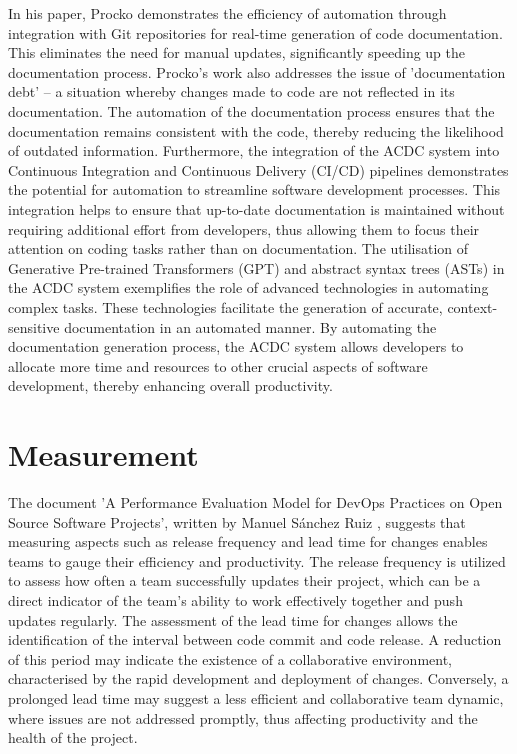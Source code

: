 In his paper, Procko \cite{Procko2024CodeDocumentation} demonstrates the efficiency of automation through integration with Git repositories for real-time generation of code documentation. This eliminates the need for manual updates, significantly speeding up the documentation process. Procko's work also addresses the issue of 'documentation debt' – a situation whereby changes made to code are not reflected in its documentation. The automation of the documentation process ensures that the documentation remains consistent with the code, thereby reducing the likelihood of outdated information. Furthermore, the integration of the ACDC system into Continuous Integration and Continuous Delivery (CI/CD) pipelines demonstrates the potential for automation to streamline software development processes. This integration helps to ensure that up-to-date documentation is maintained without requiring additional effort from developers, thus allowing them to focus their attention on coding tasks rather than on documentation. The utilisation of Generative Pre-trained Transformers (GPT) and abstract syntax trees (ASTs) in the ACDC system exemplifies the role of advanced technologies in automating complex tasks. These technologies facilitate the generation of accurate, context-sensitive documentation in an automated manner. By automating the documentation generation process, the ACDC system allows developers to allocate more time and resources to other crucial aspects of software development, thereby enhancing overall productivity.
 

\section{Measurement}

The document 'A Performance Evaluation Model for DevOps Practices on Open Source Software Projects', written by Manuel Sánchez Ruiz \cite{Ruiz2023}, suggests that measuring aspects such as release frequency and lead time for changes enables teams to gauge their efficiency and productivity. The release frequency is utilized to assess how often a team successfully updates their project, which can be a direct indicator of the team’s ability to work effectively together and push updates regularly. The assessment of the lead time for changes allows the identification of the interval between code commit and code release. A reduction of this period may indicate the existence of a collaborative environment, characterised by the rapid development and deployment of changes. Conversely, a prolonged lead time may suggest a less efficient and collaborative team dynamic, where issues are not addressed promptly, thus affecting productivity and the health of the project.

